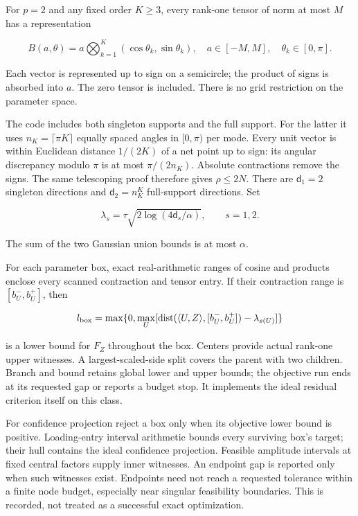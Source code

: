 For \(p=2\) and any fixed order \(K\ge3\), every rank-one tensor of norm
at most \(M\) has a representation

\[B(a,\theta)=a\bigotimes_{k=1}^K(\cos\theta_k,\sin\theta_k),
\quad a\in[-M,M],\quad\theta_k\in[0,\pi].\]

Each vector is represented up to sign on a semicircle; the product of
signs is absorbed into \(a\). The zero tensor is included. There is no
grid restriction on the parameter space.

The code includes both singleton supports and the full support. For the
latter it uses \(n_K=\lceil\pi K\rceil\) equally spaced angles in
\([0,\pi)\) per mode. Every unit vector is within Euclidean distance
\(1/(2K)\) of a net point up to sign: its angular discrepancy modulo
\(\pi\) is at most \(\pi/(2n_K)\). Absolute contractions remove the
signs. The same telescoping proof therefore gives \(\rho\le2N\). There
are \(\mathsf d_1=2\) singleton directions and \(\mathsf d_2=n_K^K\)
full-support directions. Set

\[\lambda_s=\tau\sqrt{2\log(4\mathsf d_s/\alpha)},\qquad s=1,2.\]

The sum of the two Gaussian union bounds is at most \(\alpha\).

For each parameter box, exact real-arithmetic ranges of cosine and
products enclose every scanned contraction and tensor entry. If their
contraction range is \([b_U^-,b_U^+]\), then

\[l_{\rm box}=\max\{0,\max_U[
\operatorname{dist}(\langle U,Z\rangle,[b_U^-,b_U^+])-\lambda_{s(U)}]\}\]

is a lower bound for \(F_Z\) throughout the box. Centers provide actual
rank-one upper witnesses. A largest-scaled-side split covers the parent
with two children. Branch and bound retains global lower and upper
bounds; the objective run ends at its requested gap or reports a budget
stop. It implements the ideal residual criterion itself on this class.

For confidence projection reject a box only when its objective lower
bound is positive. Loading-entry interval arithmetic bounds every
surviving box's target; their hull contains the ideal confidence
projection. Feasible amplitude intervals at fixed central factors supply
inner witnesses. An endpoint gap is reported only when such witnesses
exist. Endpoints need not reach a requested tolerance within a finite
node budget, especially near singular feasibility boundaries. This is
recorded, not treated as a successful exact optimization.


